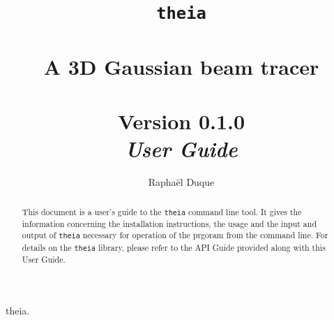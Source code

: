 \documentclass{article}
\title{\texttt{theia} \\ \quad \\A 3D Gaussian beam tracer \\ \quad \\ Version 0.1.0 \\ \textit{User Guide}}
\author{Rapha\"el Duque}
\begin{document}
\maketitle

\begin{abstract}
This document is a user's guide to the \texttt{theia} command line tool. It gives the information concerning the installation instructions, the usage and the input and output of \texttt{theia} necessary for operation of the prgoram from the command line. For details on the \texttt{theia} library, please refer to the API Guide provided along with this User Guide.
\end{abstract}

\newpage

theia.
\end{document}
